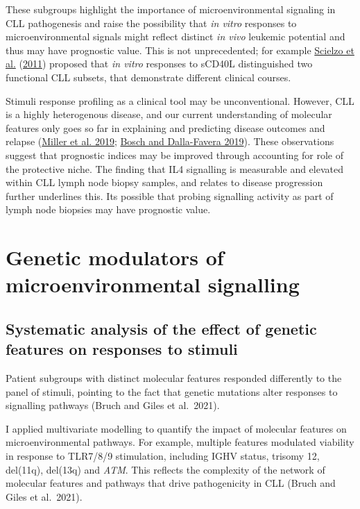 \documentclass[11pt, a4paper, twosided]{book}
\begin{document}
These subgroups highlight the importance of microenvironmental signaling in CLL pathogenesis and raise the possibility that \emph{in vitro} responses to microenvironmental signals might reflect distinct \emph{in vivo} leukemic potential and thus may have prognostic value. This is not unprecedented; for example \protect\hyperlink{ref-Scielzo2011}{Scielzo et al.} (\protect\hyperlink{ref-Scielzo2011}{2011}) proposed that \emph{in vitro} responses to sCD40L distinguished two functional CLL subsets, that demonstrate different clinical courses.

Stimuli response profiling as a clinical tool may be unconventional. However, CLL is a highly heterogenous disease, and our current understanding of molecular features only goes so far in explaining and predicting disease outcomes and relapse (\protect\hyperlink{ref-Miller2019}{Miller et al. 2019}; \protect\hyperlink{ref-Bosch2019}{Bosch and Dalla-Favera 2019}). These observations suggest that prognostic indices may be improved through accounting for role of the protective niche. The finding that IL4 signalling is measurable and elevated within CLL lymph node biopsy samples, and relates to disease progression further underlines this. Its possible that probing signalling activity as part of lymph node biopsies may have prognostic value.

\hypertarget{genetic-modulators-of-microenvironmental-signalling}{%
\section{Genetic modulators of microenvironmental signalling}\label{genetic-modulators-of-microenvironmental-signalling}}

\hypertarget{systematic-analysis-of-the-effect-of-genetic-features-on-responses-to-stimuli-1}{%
\subsection{Systematic analysis of the effect of genetic features on responses to stimuli}\label{systematic-analysis-of-the-effect-of-genetic-features-on-responses-to-stimuli-1}}

Patient subgroups with distinct molecular features responded differently to the panel of stimuli, pointing to the fact that genetic mutations alter responses to signalling pathways (Bruch and Giles et al.~2021).

I applied multivariate modelling to quantify the impact of molecular features on microenvironmental pathways. For example, multiple features modulated viability in response to TLR7/8/9 stimulation, including IGHV status, trisomy 12, del(11q), del(13q) and \emph{ATM}. This reflects the complexity of the network of molecular features and pathways that drive pathogenicity in CLL (Bruch and Giles et al.~2021).
\end{document}
